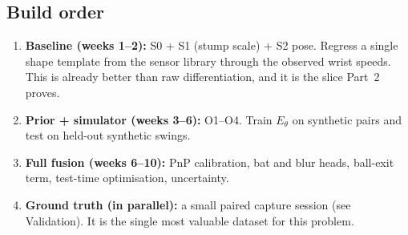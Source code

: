 \documentclass[11pt,a4paper]{article}
\begin{document}
\subsection{Build order}
\begin{enumerate}[label=\textbf{\arabic*.}]
  \item \textbf{Baseline (weeks 1--2):} S0 + S1 (stump scale) + S2 pose. Regress a single shape template from the sensor library through the observed wrist speeds. This is already better than raw differentiation, and it is the slice Part~2 proves.
  \item \textbf{Prior + simulator (weeks 3--6):} O1--O4. Train $E_\theta$ on synthetic pairs and test on held-out synthetic swings.
  \item \textbf{Full fusion (weeks 6--10):} PnP calibration, bat and blur heads, ball-exit term, test-time optimisation, uncertainty.
  \item \textbf{Ground truth (in parallel):} a small paired capture session (see Validation). It is the single most valuable dataset for this problem.
\end{enumerate}
\end{document}

